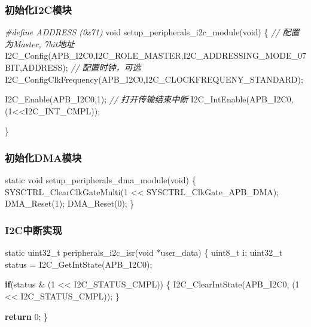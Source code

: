 \documentclass[
  12pt,
]{book}
\newenvironment{Shaded}{\begin{snugshade}}{\end{snugshade}}
\newcommand{\CommentTok}[1]{\textcolor[rgb]{0.56,0.35,0.01}{\textit{#1}}}
\newcommand{\ControlFlowTok}[1]{\textcolor[rgb]{0.13,0.29,0.53}{\textbf{#1}}}
\newcommand{\DataTypeTok}[1]{\textcolor[rgb]{0.13,0.29,0.53}{#1}}
\newcommand{\DecValTok}[1]{\textcolor[rgb]{0.00,0.00,0.81}{#1}}
\newcommand{\NormalTok}[1]{#1}
\newcommand{\PreprocessorTok}[1]{\textcolor[rgb]{0.56,0.35,0.01}{\textit{#1}}}
\begin{document}
\hypertarget{ux521dux59cbux5316i2cux6a21ux5757-4}{%
\subsubsection{初始化I2C模块}\label{ux521dux59cbux5316i2cux6a21ux5757-4}}

\begin{Shaded}
\begin{Highlighting}[]
\PreprocessorTok{#define ADDRESS (0x71)}
\DataTypeTok{void}\NormalTok{ setup_peripherals_i2c_module(}\DataTypeTok{void}\NormalTok{)}
\NormalTok{\{}
  \CommentTok{// 配置为Master, 7bit地址}
\NormalTok{  I2C_Config(APB_I2C0,I2C_ROLE_MASTER,I2C_ADDRESSING_MODE_07BIT,ADDRESS);}
  \CommentTok{// 配置时钟，可选}
\NormalTok{  I2C_ConfigClkFrequency(APB_I2C0,I2C_CLOCKFREQUENY_STANDARD);}
  
\NormalTok{  I2C_Enable(APB_I2C0,}\DecValTok{1}\NormalTok{);}
  \CommentTok{// 打开传输结束中断}
\NormalTok{  I2C_IntEnable(APB_I2C0,(}\DecValTok{1}\NormalTok{<<I2C_INT_CMPL));}

\NormalTok{\}}
\end{Highlighting}
\end{Shaded}

\hypertarget{ux521dux59cbux5316dmaux6a21ux5757}{%
\subsubsection{初始化DMA模块}\label{ux521dux59cbux5316dmaux6a21ux5757}}

\begin{Shaded}
\begin{Highlighting}[]
\DataTypeTok{static} \DataTypeTok{void}\NormalTok{ setup_peripherals_dma_module(}\DataTypeTok{void}\NormalTok{)}
\NormalTok{\{}
\NormalTok{    SYSCTRL_ClearClkGateMulti(}\DecValTok{1}\NormalTok{ << SYSCTRL_ClkGate_APB_DMA);}
\NormalTok{    DMA_Reset(}\DecValTok{1}\NormalTok{);}
\NormalTok{    DMA_Reset(}\DecValTok{0}\NormalTok{);}
\NormalTok{\}}
\end{Highlighting}
\end{Shaded}

\hypertarget{i2cux4e2dux65adux5b9eux73b0-2}{%
\subsubsection{I2C中断实现}\label{i2cux4e2dux65adux5b9eux73b0-2}}

\begin{Shaded}
\begin{Highlighting}[]
\DataTypeTok{static} \DataTypeTok{uint32_t}\NormalTok{ peripherals_i2c_isr(}\DataTypeTok{void}\NormalTok{ *user_data)}
\NormalTok{\{}
  \DataTypeTok{uint8_t}\NormalTok{ i;}
  \DataTypeTok{uint32_t}\NormalTok{ status = I2C_GetIntState(APB_I2C0);}
  
  \ControlFlowTok{if}\NormalTok{(status & (}\DecValTok{1}\NormalTok{ << I2C_STATUS_CMPL))}
\NormalTok{  \{}
\NormalTok{    I2C_ClearIntState(APB_I2C0, (}\DecValTok{1}\NormalTok{ << I2C_STATUS_CMPL));}
\NormalTok{  \}}

  \ControlFlowTok{return} \DecValTok{0}\NormalTok{;}
\NormalTok{\}}
\end{Highlighting}
\end{Shaded}
\end{document}
